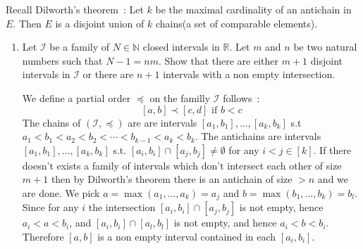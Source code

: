 \documentclass[a4paper,11pt]{exam}
\newcommand{\N}{\mathbb{N}}
\newcommand{\R}{\mathbb{R}}
\begin{document}
	
	
	\begin{questions}		
		
		Recall Dilworth’s theorem~: 
		Let $k$ be the maximal cardinality of an antichain in $E$.
		Then $E$ is a disjoint union of $k$ chains(a set of comparable elements).		
		\begin{enumerate}			
			
			\item Let  $\mathcal{I}$ be a family of $N\in \N$ closed intervals in $\R$. Let $m$ and $n$ be two natural numbers such that $N-1=nm$.
			Show that there are either $m+1$ disjoint intervals in $\mathcal{I}$ or there are $n+1$ intervals with a non empty intersection.
			
			\newcommand{\I}{\mathcal{I}}
			
			\begin{solution}
				We define a partial order $\preceq$ on the familly $\I$ follows~:
				\[
				[a,b] \prec [c,d] \text{ if } b<c
				\]
				The chains of $(\I,\preceq)$ are are intervals $[a_1,b_1], \dots, [a_k,b_k]$ s.t $a_1 < b_1 < a_2 < b_2 < \cdots < b_{k-1} < a_k < b_k$.
				The antichains are intervals $[a_1,b_1], \dots, [a_k,b_k]$ s.t. $[a_i,b_i] \cap [a_j,b_j]\neq \emptyset$ for any $i<j\in[k]$. 
				If there doesn't exists a family of intervals which don't intersect each other of size $m+1$ then by Dilworth's theorem there is an antichain of size $>n$ and we are done. We pick $a = \max(a_1, \dots, a_k)=a_j$ and $b = \max(b_1, \dots, b_k)=b_l$. Since for any $i$ the intersection $[a_i,b_i] \cap [a_j,b_j]$ is not empty, hence $a_i < a < b_i$, and $[a_i,b_i] \cap [a_l,b_l]$ is not empty, and hence $a_i < b < b_i$.
				Therefore $[a,b]$ is a non empty interval contained in each $[a_i,b_i]$.
				
				
				
				

\end{solution}
\end{enumerate}
\end{questions}
\end{document}
